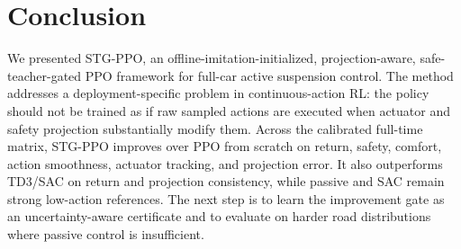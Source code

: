 \documentclass[letterpaper,twocolumn]{article}
\begin{document}
\section{Conclusion}

We presented STG-PPO, an offline-imitation-initialized, projection-aware, safe-teacher-gated PPO framework for full-car active suspension control.
The method addresses a deployment-specific problem in continuous-action RL: the policy should not be trained as if raw sampled actions are executed when actuator and safety projection substantially modify them.
Across the calibrated full-time matrix, STG-PPO improves over PPO from scratch on return, safety, comfort, action smoothness, actuator tracking, and projection error.
It also outperforms TD3/SAC on return and projection consistency, while passive and SAC remain strong low-action references.
The next step is to learn the improvement gate as an uncertainty-aware certificate and to evaluate on harder road distributions where passive control is insufficient.



\end{document}
